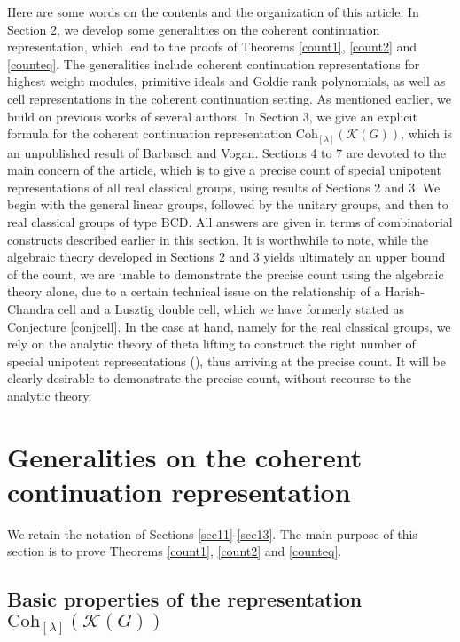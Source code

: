 \documentclass[12pt,a4paper]{amsart}
\newcommand{\CK}{{\mathcal {K}}}
\numberwithin{equation}{section}
\theoremstyle{remark}
\def\Coh{\mathrm{Coh}}
\newcommand{\Lam}{{[\lambda]}}
\begin{document}
Here are some words on the contents and the organization of this article. In Section 2, we develop some generalities on the coherent continuation representation, which lead to the proofs of Theorems \ref{count1}, \ref{count2} and \ref{counteq}. The generalities include coherent continuation representations for highest weight modules, primitive ideals and Goldie rank polynomials, as well as cell representations in the coherent continuation setting. As mentioned earlier, we build on previous works of several authors.
In Section 3, we give an explicit formula for the coherent continuation representation $\Coh_{\Lam}(\CK(G))$, which is an unpublished result of Barbasch and Vogan. Sections 4 to 7 are devoted to the main concern of the article, which is to give a precise count of special unipotent representations of all real classical groups, using results of Sections 2 and 3. We begin with the general linear groups, followed by the unitary groups, and then to real classical groups of type $\mathrm{BCD}$. All answers are given in terms of combinatorial constructs described earlier in this section. It is worthwhile to note, while the algebraic theory developed in Sections 2 and 3 yields ultimately an upper bound of the count, we are unable to demonstrate the precise count using the algebraic theory alone, due to a certain technical issue on the relationship of a Harish-Chandra cell and a Lusztig double cell, which we have formerly stated as Conjecture \ref{conjcell}. In the case at hand, namely for the real classical groups, we rely on the analytic theory of theta lifting to construct the right number of special unipotent representations (\cite{BMSZ2}), thus arriving at the precise count. It will be clearly desirable to demonstrate the precise count, without recourse to the analytic theory.



\section{Generalities on the coherent continuation representation}
\label{sec:pfGeneral}
 We retain the notation of Sections \ref{sec11}-\ref{sec13}. The main purpose of this section is to prove Theorems \ref{count1}, \ref{count2} and \ref{counteq}.

\subsection{Basic properties of the representation $\Coh_{[\lambda]}(\CK(G))$}
\end{document}
